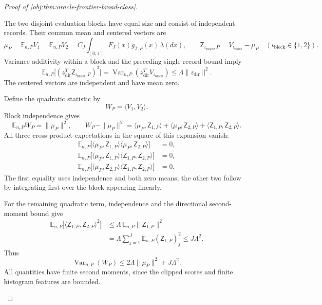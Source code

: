 \begin{proof}[Proof of \cref{obj:thm:oracle-frontier-broad-class}]
\begin{enumerate}
The two disjoint evaluation blocks have equal size and consist of independent records. Their common mean and centered vectors are
\[
\mu_P
=\mathbb E_{n,P}V_1
=\mathbb E_{n,P}V_2
=C_J\int_{[0,1]}F_J(x)g_{T,P}(x)\,\lambda(dx),
\qquad
\mathsf Z_{\iota_{\mathrm{block}},P}=V_{\iota_{\mathrm{block}}}-\mu_P\quad(\iota_{\mathrm{block}}\in\{1,2\}).
\]
Variance additivity within a block and the preceding single-record bound imply
\[
\mathbb E_{n,P}
\bigl[(z_{\mathrm{dir}}^T\mathsf Z_{\iota_{\mathrm{block}},P})^2\bigr]
=
\operatorname{Var}_{n,P}(z_{\mathrm{dir}}^TV_{\iota_{\mathrm{block}}})
\le\Lambda\|z_{\mathrm{dir}}\|^2.
\]
The centered vectors are independent and have mean zero.

Define the quadratic statistic by
\[
W_P=\langle V_1,V_2\rangle.
\]
Block independence gives
\[
\mathbb E_{n,P}W_P=\|\mu_P\|^2,
\qquad
W_P-\|\mu_P\|^2
=
\langle\mu_P,\mathsf Z_{1,P}\rangle
+\langle\mu_P,\mathsf Z_{2,P}\rangle
+\langle\mathsf Z_{1,P},\mathsf Z_{2,P}\rangle.
\]
All three cross-product expectations in the square of this expansion vanish:
\[
\begin{aligned}
\mathbb E_{n,P}
\bigl[\langle\mu_P,\mathsf Z_{1,P}\rangle
      \langle\mu_P,\mathsf Z_{2,P}\rangle\bigr]&=0,\\
\mathbb E_{n,P}
\bigl[\langle\mu_P,\mathsf Z_{1,P}\rangle
      \langle\mathsf Z_{1,P},\mathsf Z_{2,P}\rangle\bigr]&=0,\\
\mathbb E_{n,P}
\bigl[\langle\mu_P,\mathsf Z_{2,P}\rangle
      \langle\mathsf Z_{1,P},\mathsf Z_{2,P}\rangle\bigr]&=0.
\end{aligned}
\]
The first equality uses independence and both zero means; the other two follow by integrating first over the block appearing linearly.

For the remaining quadratic term, independence and the directional second-moment bound give
\[
\begin{aligned}
\mathbb E_{n,P}
\bigl[\langle\mathsf Z_{1,P},\mathsf Z_{2,P}\rangle^2\bigr]
&\le\Lambda\,\mathbb E_{n,P}\|\mathsf Z_{1,P}\|^2\\
&=\Lambda\sum_{j=1}^J
\mathbb E_{n,P}(\mathsf Z_{1,P})_j^2
\le J\Lambda^2.
\end{aligned}
\]
Thus
\[
\operatorname{Var}_{n,P}(W_P)
\le2\Lambda\|\mu_P\|^2+J\Lambda^2.
\]
All quantities have finite second moments, since the clipped scores and finite histogram features are bounded.


\end{enumerate}
\end{proof}
